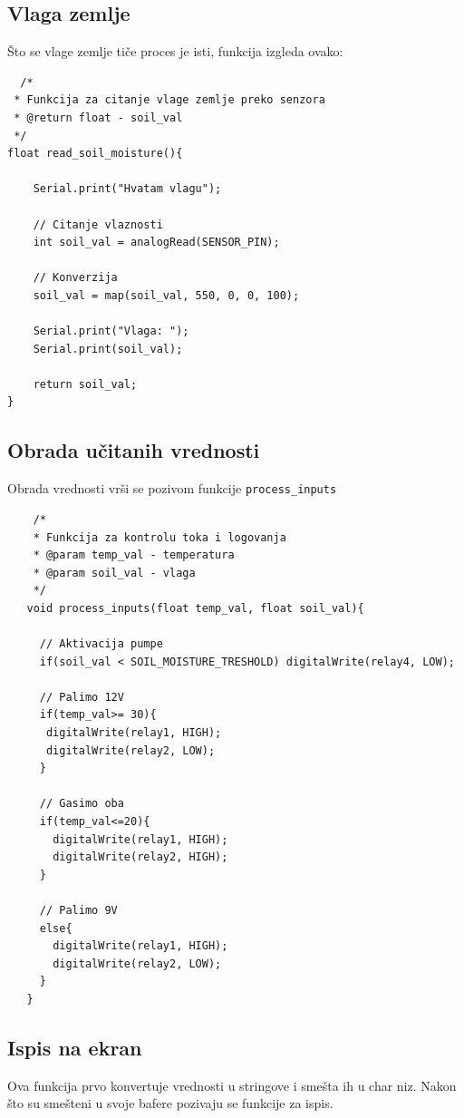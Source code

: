 \documentclass[a4paper,11pt]{book}
\begin{document}
\subsection{Vlaga zemlje}

Što se vlage zemlje tiče proces je isti, funkcija izgleda ovako:

\begin{lstlisting}
  /*
 * Funkcija za citanje vlage zemlje preko senzora
 * @return float - soil_val
 */
float read_soil_moisture(){

	Serial.print("Hvatam vlagu");

	// Citanje vlaznosti
	int soil_val = analogRead(SENSOR_PIN);

	// Konverzija
	soil_val = map(soil_val, 550, 0, 0, 100);

	Serial.print("Vlaga: ");
	Serial.print(soil_val);

	return soil_val;
}
  \end{lstlisting}

  \subsection{Obrada učitanih vrednosti}

  Obrada vrednosti vrši se pozivom funkcije \verb|process_inputs|

  \begin{lstlisting}
    /*
    * Funkcija za kontrolu toka i logovanja
    * @param temp_val - temperatura
    * @param soil_val - vlaga
    */
   void process_inputs(float temp_val, float soil_val){
    
     // Aktivacija pumpe
     if(soil_val < SOIL_MOISTURE_TRESHOLD) digitalWrite(relay4, LOW);

     // Palimo 12V
     if(temp_val>= 30){
      digitalWrite(relay1, HIGH);
      digitalWrite(relay2, LOW);
     }

     // Gasimo oba
     if(temp_val<=20){
       digitalWrite(relay1, HIGH);
       digitalWrite(relay2, HIGH);
     }

     // Palimo 9V
     else{
       digitalWrite(relay1, HIGH);
       digitalWrite(relay2, LOW);
     }
   }
    \end{lstlisting}

  
    \subsection{Ispis na ekran}

    Ova funkcija prvo konvertuje vrednosti u stringove i smešta ih u char niz. Nakon što su smešteni u svoje bafere pozivaju se funkcije za ispis.
\end{document}
